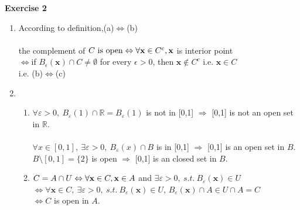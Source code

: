\documentclass[11pt,letter,notitlepage]{article}
\theoremstyle{definition}
\begin{document}
		\begin{solution}
		\textbf{Exercise 2}
			\begin{enumerate}
                \item
                According to definition,(a)$\Leftrightarrow$(b)\\\\
                the complement of $C\text{ is open}\\
                \Leftrightarrow \forall \mathbf{x}\in C^c,\mathbf{x}$ is interior point\\
                $\Leftrightarrow $if $B_{\epsilon}(\mathbf{x})\cap C \not=\emptyset$ for every $\epsilon>0$, then $\mathbf{x}\notin C^c$ i.e. $\mathbf{x}\in C$\\
                i.e. (b)$\Leftrightarrow$(c)
                
                \item
                \begin{enumerate}
                    \item
                    $\forall \varepsilon>0,~ B_{\varepsilon}(1)\cap \mathbb{R}=B_{\varepsilon}(1)$ is not in [0,1] $\Rightarrow$ [0,1] is not an open set in $\mathbb{R}$.\\\\
                    $\forall x \in [0,1],~\exists \varepsilon>0,~ B_{\varepsilon}(x)\cap B$ is in [0,1] $\Rightarrow$ [0,1] is an open set in $B$.\\
                    $B\setminus[0,1]=\{2\}$ is open $\Rightarrow$ [0,1] is an closed set in $B$.
                    
                    \item
                    $C=A\cap U \\
                    \Leftrightarrow \forall\mathbf{x}\in C,\mathbf{x} \in A $ and $\exists \varepsilon>0 , ~s.t.~ B_{\varepsilon}(\mathbf{x})\in U$\\
                    $\Leftrightarrow\forall \mathbf{x}\in C,~\exists \varepsilon>0 , ~s.t.~ B_{\varepsilon}(\mathbf{x})\in U$, $B_{\varepsilon}(\mathbf{x})\cap A\in U\cap A=C$\\
                    $\Leftrightarrow C$ is open in $A$.
                \end{enumerate}

			\end{enumerate}

		\end{solution}
		\newpage
		
\end{document}
